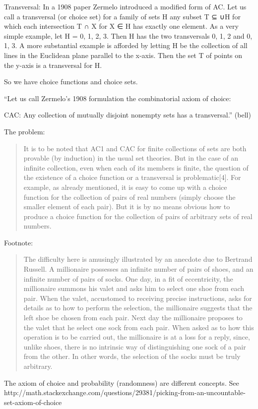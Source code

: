 \documentclass[reqno,12pt]{tufte-book}
\numberwithin{equation}{subsection}
\begin{document}
Transversal:  In a 1908 paper Zermelo introduced a modified form of AC. Let us call a transversal (or choice set) for a family of sets H any subset T ⊆ ∪H for which each intersection T ∩ X for X ∈ H has exactly one element.  As a very simple example, let H = {{0}, {1}, {2, 3}}. Then H has the two transversals {0, 1, 2} and {0, 1, 3}. A more substantial example is afforded by letting H be the collection of all lines in the Euclidean plane parallel to the x-axis. Then the set T of points on the y-axis is a transversal for H.

So we have choice functions and choice sets.


``Let us call Zermelo's 1908 formulation the combinatorial axiom of choice:

CAC: 
Any collection of mutually disjoint nonempty sets has a transversal.'' (bell)


The problem:


\blockquote{It is to be noted that AC1 and CAC for finite collections
  of sets are both provable (by induction) in the usual set
  theories. But in the case of an infinite collection, even when each
  of its members is finite, the question of the existence of a choice
  function or a transversal is problematic[4]. For example, as already
  mentioned, it is easy to come up with a choice function for the
  collection of pairs of real numbers (simply choose the smaller
  element of each pair). But it is by no means obvious how to produce
  a choice function for the collection of pairs of arbitrary sets of
  real numbers.\cite{bell_axiom_2013}}

Footnote: 
\blockquote{The difficulty here is amusingly illustrated by an anecdote due to Bertrand Russell. A millionaire possesses an infinite number of pairs of shoes, and an infinite number of pairs of socks. One day, in a fit of eccentricity, the millionaire summons his valet and asks him to select one shoe from each pair. When the valet, accustomed to receiving precise instructions, asks for details as to how to perform the selection, the millionaire suggests that the left shoe be chosen from each pair. Next day the millionaire proposes to the valet that he select one sock from each pair. When asked as to how this operation is to be carried out, the millionaire is at a loss for a reply, since, unlike shoes, there is no intrinsic way of distinguishing one sock of a pair from the other. In other words, the selection of the socks must be truly arbitrary.}

The axiom of choice and probability (randomness) are different
concepts.  See
http://math.stackexchange.com/questions/29381/picking-from-an-uncountable-set-axiom-of-choice
\end{document}
